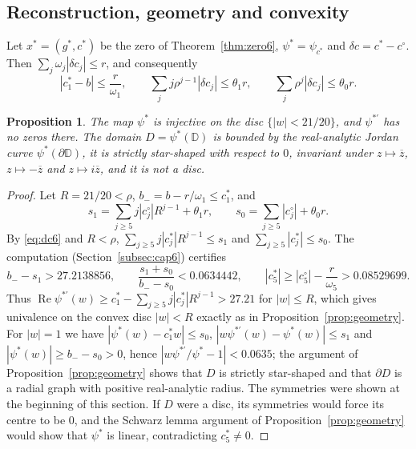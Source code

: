 \documentclass[11pt]{amsart}
\newtheorem{proposition}[theorem]{Proposition}
\theoremstyle{definition}
\theoremstyle{remark}
\numberwithin{equation}{section}
\newcommand{\D}{\mathbb{D}}
\DeclareMathOperator{\re}{Re}
\begin{document}
\subsection{Reconstruction, geometry and convexity}
Let $x^*=(g^*,c^*)$ be the zero of Theorem~\ref{thm:zero6}, $\psi^*=\psi_{c^*}$ and $\delta c=c^*-c^\circ$. Then $\sum_j\omega_j|\delta c_j|\leq r$, and consequently
\begin{equation}\label{eq:dc6}
|c^*_1-b|\leq\frac r{\omega_1},\qquad\sum_jj\rho^{j-1}|\delta c_j|\leq\theta_1r,\qquad\sum_j\rho^j|\delta c_j|\leq\theta_0r .
\end{equation}

\begin{proposition}\label{prop:geometry6}
The map $\psi^*$ is injective on the disc $\{|w|<21/20\}$, and $\psi^{*\prime}$ has no zeros there. The domain $D=\psi^*(\D)$ is bounded by the real-analytic Jordan curve $\psi^*(\partial\D)$, it is strictly star-shaped with respect to $0$, invariant under $z\mapsto\overline z$, $z\mapsto-\overline z$ and $z\mapsto i\overline z$, and it is not a disc.
\end{proposition}

\begin{proof}
Let $R=21/20<\rho$, $b_-=b-r/\omega_1\leq c^*_1$, and
\[
s_1=\sum_{j\geq5}j|c^\circ_j|R^{j-1}+\theta_1r,\qquad s_0=\sum_{j\geq5}|c^\circ_j|+\theta_0r .
\]
By \eqref{eq:dc6} and $R<\rho$, $\sum_{j\geq5}j|c^*_j|R^{j-1}\leq s_1$ and $\sum_{j\geq5}|c^*_j|\leq s_0$. The computation (Section~\ref{subsec:cap6}) certifies
\begin{equation}\label{eq:geom6}
b_--s_1>27.2138856,\qquad\frac{s_1+s_0}{b_--s_0}<0.0634442,\qquad|c^*_5|\geq|c^\circ_5|-\frac r{\omega_5}>0.08529699 .
\end{equation}
Thus $\re\psi^{*\prime}(w)\geq c^*_1-\sum_{j\geq5}j|c^*_j|R^{j-1}>27.21$ for $|w|\leq R$, which gives univalence on the convex disc $|w|<R$ exactly as in Proposition~\ref{prop:geometry}. For $|w|=1$ we have $|\psi^*(w)-c_1^*w|\leq s_0$, $|w\psi^{*\prime}(w)-\psi^*(w)|\leq s_1$ and $|\psi^*(w)|\geq b_--s_0>0$, hence $|w\psi^{*\prime}/\psi^*-1|<0.0635$; the argument of Proposition~\ref{prop:geometry} shows that $D$ is strictly star-shaped and that $\partial D$ is a radial graph with positive real-analytic radius. The symmetries were shown at the beginning of this section. If $D$ were a disc, its symmetries would force its centre to be $0$, and the Schwarz lemma argument of Proposition~\ref{prop:geometry} would show that $\psi^*$ is linear, contradicting $c^*_5\neq0$.
\end{proof}
\end{document}
